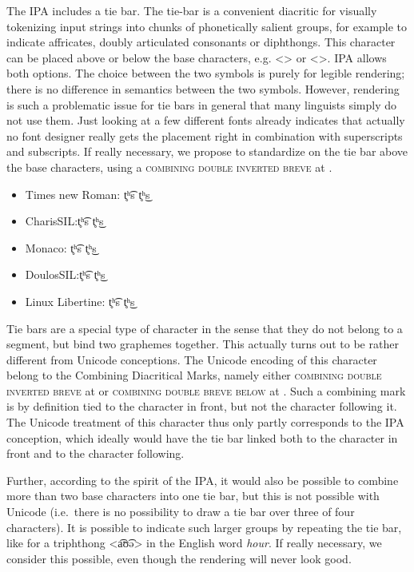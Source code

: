 The IPA includes a tie bar. The tie-bar is a convenient diacritic for visually
tokenizing input strings into chunks of phonetically salient groups, for example
to indicate affricates, doubly articulated consonants or diphthongs. This
character can be placed above or below the base characters, e.g. <>
or <>. IPA allows both options. The choice between the two symbols
is purely for legible rendering; there is no difference in semantics between the
two symbols. However, rendering is such a problematic issue for tie bars in
general that many linguists simply do not use them. Just looking at a few
different fonts already indicates that actually no font designer really gets the
placement right in combination with superscripts and subscripts. If really
necessary, we propose to standardize on the tie bar above the base characters,
using a \textsc{combining double inverted breve} at .

\begin{itemize}[itemsep=6pt]
  \item[] {Times new Roman: t̥ʰ͡s t̥ʰ͜s}
  \item[] {\small {}CharisSIL:\@ t̥ʰ͡s t̥ʰ͜s}
  \item[] {\footnotesize {}Monaco: t̥ʰ͡s t̥ʰ͜s}
  \item[] {DoulosSIL:\@ t̥ʰ͡s t̥ʰ͜s}
  \item[] Linux Libertine: t̥ʰ͡s t̥ʰ͜s
\end{itemize}

Tie bars are a special type of character in the sense that they do not belong to
a segment, but bind two graphemes together. This actually turns out to be rather
different from Unicode conceptions. The Unicode encoding of this character
belong to the Combining Diacritical Marks, namely either \textsc{combining double
inverted breve} at  or \textsc{combining double breve below} at
. Such a combining mark is by definition tied to the character in
front, but not the character following it. The Unicode treatment of this
character thus only partly corresponds to the IPA conception, which ideally
would have the tie bar linked both to the character in front and to the
character following. 

Further, according to the spirit of the IPA, it would also be possible to
combine more than two base characters into one tie bar, but this is not possible
with Unicode (i.e.~there is no possibility to draw a tie bar over three of four
characters). It is possible to indicate such larger groups by repeating the tie
bar, like for a triphthong <a͡ʊ͡ə> in the English word \textit{hour}. If really
necessary, we consider this possible, even though the rendering will never look
good. 

